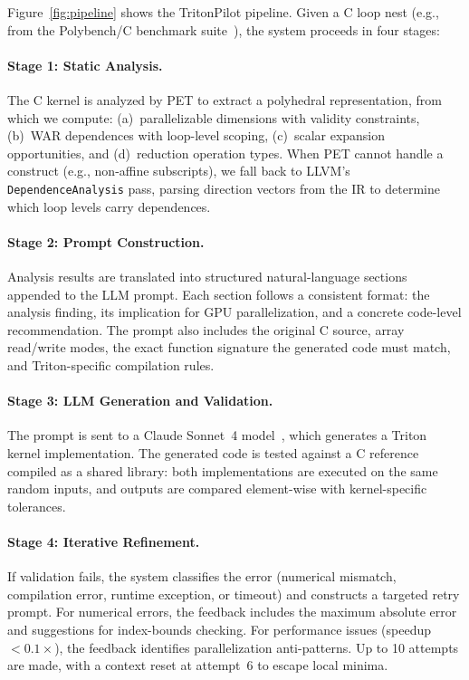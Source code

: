 \documentclass[sigconf]{acmart}
\newcommand{\sysname}{TritonPilot\xspace}
\newcommand{\pet}{PET\xspace}
\begin{document}
Figure~\ref{fig:pipeline} shows the \sysname pipeline.  Given a C loop
nest (e.g., from the Polybench/C benchmark suite~\cite{polybench}), the
system proceeds in four stages:

\paragraph{Stage 1: Static Analysis.}
The C kernel is analyzed by \pet{} to extract a polyhedral
representation, from which we compute: (a)~parallelizable dimensions
with validity constraints, (b)~WAR dependences with loop-level scoping,
(c)~scalar expansion opportunities, and (d)~reduction operation types.
When \pet{} cannot handle a construct (e.g., non-affine subscripts), we
fall back to LLVM's \texttt{DependenceAnalysis} pass, parsing direction
vectors from the IR to determine which loop levels carry dependences.

\paragraph{Stage 2: Prompt Construction.}
Analysis results are translated into structured natural-language sections
appended to the LLM prompt.  Each section follows a consistent format:
the analysis finding, its implication for GPU parallelization, and a
concrete code-level recommendation.  The prompt also includes the
original C source, array read/write modes, the exact function signature
the generated code must match, and Triton-specific compilation rules.

\paragraph{Stage 3: LLM Generation and Validation.}
The prompt is sent to a Claude Sonnet~4 model~\cite{anthropic2025claude},
which generates a Triton kernel implementation.  The generated code is
tested against a C reference compiled as a shared library: both
implementations are executed on the same random inputs, and outputs are
compared element-wise with kernel-specific tolerances.

\paragraph{Stage 4: Iterative Refinement.}
If validation fails, the system classifies the error (numerical
mismatch, compilation error, runtime exception, or timeout) and
constructs a targeted retry prompt.  For numerical errors, the feedback
includes the maximum absolute error and suggestions for index-bounds
checking.  For performance issues (speedup~$<0.1\times$), the feedback
identifies parallelization anti-patterns.  Up to 10 attempts are made,
with a context reset at attempt~6 to escape local minima.
\end{document}
